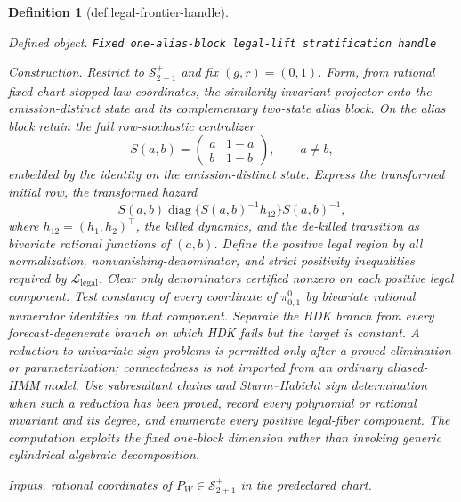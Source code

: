 \documentclass{article}
\newtheorem{definition}{Definition}
\begin{document}
\begin{definition}[def:legal-frontier-handle]\label{def:legal-frontier-handle}
\par\smallskip\noindent\emph{Defined object.} \texttt{Fixed one-\allowbreak{}alias-\allowbreak{}block legal-\allowbreak{}lift stratification handle}
\par\smallskip\noindent\emph{Construction.} Restrict to \(\mathcal S^{+}_{2+1}\) and fix \((g,r)=(0,1)\). Form, from rational fixed-chart stopped-law coordinates, the similarity-invariant projector onto the emission-distinct state and its complementary two-state alias block. On the alias block retain the full row-stochastic centralizer
\[
 S(a,b)=\begin{pmatrix}a&1-a\\ b&1-b\end{pmatrix},\qquad a\ne b,
\]
embedded by the identity on the emission-distinct state. Express the transformed initial row, the transformed hazard
\[
 S(a,b)\operatorname{diag}\{S(a,b)^{-1}h_{12}\}S(a,b)^{-1},
\]
where \(h_{12}=(h_1,h_2)^{\top}\), the killed dynamics, and the de-killed transition as bivariate rational functions of \((a,b)\). Define the positive legal region by all normalization, nonvanishing-denominator, and strict positivity inequalities required by \(\mathcal L_{\mathrm{legal}}\). Clear only denominators certified nonzero on each positive legal component. Test constancy of every coordinate of \(\pi^0_{0,1}\) by bivariate rational numerator identities on that component. Separate the HDK branch from every forecast-degenerate branch on which HDK fails but the target is constant. A reduction to univariate sign problems is permitted only after a proved elimination or parameterization; connectedness is not imported from an ordinary aliased-HMM model. Use subresultant chains and Sturm--Habicht sign determination when such a reduction has been proved, record every polynomial or rational invariant and its degree, and enumerate every positive legal-fiber component. The computation exploits the fixed one-block dimension rather than invoking generic cylindrical algebraic decomposition.
\par\smallskip\noindent\emph{Inputs.} rational coordinates of \(P_W\in\mathcal S^{+}_{2+1}\) in the predeclared chart.
\end{definition}
\end{document}
